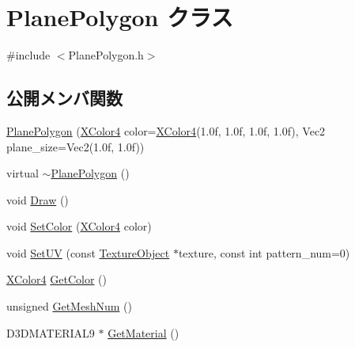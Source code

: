 \hypertarget{class_plane_polygon}{}\section{Plane\+Polygon クラス}
\label{class_plane_polygon}


{\ttfamily \#include $<$Plane\+Polygon.\+h$>$}

\subsection*{公開メンバ関数}
\begin{DoxyCompactItemize}
\item 
\mbox{\hyperlink{class_plane_polygon_a27987c23a242840b142e0fa11650daf6}{Plane\+Polygon}} (\mbox{\hyperlink{_vector3_d_8h_a680c30c4a07d86fe763c7e01169cd6cc}{X\+Color4}} color=\mbox{\hyperlink{_vector3_d_8h_a680c30c4a07d86fe763c7e01169cd6cc}{X\+Color4}}(1.\+0f, 1.\+0f, 1.\+0f, 1.\+0f), Vec2 plane\+\_\+size=\+Vec2(1.\+0f, 1.\+0f))
\item 
virtual \mbox{\hyperlink{class_plane_polygon_ac91d7ac1ceb00239f54b543690a78dab}{$\sim$\+Plane\+Polygon}} ()
\item 
void \mbox{\hyperlink{class_plane_polygon_a2f20691ee0feee4fa428f5d017d7062a}{Draw}} ()
\item 
void \mbox{\hyperlink{class_plane_polygon_a55307fc341641d7fd42fe2269acbd113}{Set\+Color}} (\mbox{\hyperlink{_vector3_d_8h_a680c30c4a07d86fe763c7e01169cd6cc}{X\+Color4}} color)
\item 
void \mbox{\hyperlink{class_plane_polygon_a081458fcb9e758dd8be5b027c66a92ad}{Set\+UV}} (const \mbox{\hyperlink{class_texture_object}{Texture\+Object}} $\ast$texture, const int pattern\+\_\+num=0)
\item 
\mbox{\hyperlink{_vector3_d_8h_a680c30c4a07d86fe763c7e01169cd6cc}{X\+Color4}} \mbox{\hyperlink{class_plane_polygon_ac4f8f7b51acdb744231efd342d3b2734}{Get\+Color}} ()
\item 
unsigned \mbox{\hyperlink{class_plane_polygon_a05f4f63c2d04d30f7b9808c009101403}{Get\+Mesh\+Num}} ()
\item 
D3\+D\+M\+A\+T\+E\+R\+I\+A\+L9 $\ast$ \mbox{\hyperlink{class_plane_polygon_a808087c9d82c0eb7cfb0709c9906e833}{Get\+Material}} ()
\end{DoxyCompactItemize}
